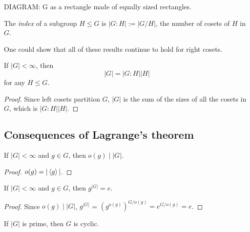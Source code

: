 \documentclass{../../template/note}
\begin{document}
    DIAGRAM: G as a rectangle made of equally sized rectangles.

    \begin{definition}
        The \emph{index} of a subgroup \(H \leq G\) is \(|G : H| := |G / H|\), the number of cosets of \(H\) in \(G\).
    \end{definition}
    
    \begin{remark*}
        One could show that all of these results continue to hold for right cosets.
    \end{remark*}
    
    \begin{theorem}[Lagrange]
        If \(|G| < \infty\), then
        \[
            |G| = |G:H||H|
        \]
        for any \(H \leq G\).
    \end{theorem}
    
    \begin{proof}
        Since left cosets partition \(G\), \(|G|\) is the sum of the sizes of all the cosets in \(G\), which is \(|G : H||H|\).
    \end{proof}
    
    \subsection{Consequences of Lagrange's theorem}

    \begin{corollary}
        If \(|G| < \infty\) and \(g \in G\), then \(o(g) \mid |G|\).
    \end{corollary}
    
    \begin{proof}
        \(o(g) = |\left \langle g \right \rangle|\).
    \end{proof}
    
    \begin{corollary}
        If \(|G| < \infty\) and \(g \in G\), then \(g^{|G|} = e\).
        \label{element-to-order-is-identity}
    \end{corollary}
    
    \begin{proof}
        Since \(o(g) \mid |G|\), \(g^{|G|}\) = \((g^{o(g)})^{G/o(g)} = e^{G/o(g)} = e\).
    \end{proof}
    
    \begin{corollary}
        If \(|G|\) is prime, then \(G\) is cyclic.
        \label{prime-groups-cyclic}
    \end{corollary}
    
\end{document}
